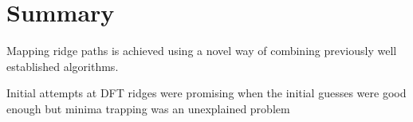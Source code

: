 \chapter{Summary}
\label{chap:summary}


\bit
\item Mapping ridge paths is achieved using a novel way of combining previously well established  algorithms.
\item \expand
\item Initial attempts at DFT ridges were promising when the initial guesses were good enough but minima trapping was an unexplained problem
\eit

\placeholder


